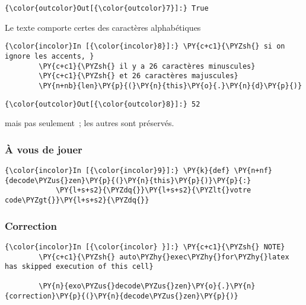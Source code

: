\begin{Verbatim}[commandchars=\\\{\},frame=single,framerule=0.3mm,rulecolor=\color{cellframecolor}]
{\color{outcolor}Out[{\color{outcolor}7}]:} True
\end{Verbatim}
            
    Le texte comporte certes des caractères alphabétiques

    \begin{Verbatim}[commandchars=\\\{\},frame=single,framerule=0.3mm,rulecolor=\color{cellframecolor}]
{\color{incolor}In [{\color{incolor}8}]:} \PY{c+c1}{\PYZsh{} si on ignore les accents, }
        \PY{c+c1}{\PYZsh{} il y a 26 caractères minuscules}
        \PY{c+c1}{\PYZsh{} et 26 caractères majuscules}
        \PY{n+nb}{len}\PY{p}{(}\PY{n}{this}\PY{o}{.}\PY{n}{d}\PY{p}{)}
\end{Verbatim}


\begin{Verbatim}[commandchars=\\\{\},frame=single,framerule=0.3mm,rulecolor=\color{cellframecolor}]
{\color{outcolor}Out[{\color{outcolor}8}]:} 52
\end{Verbatim}
            
    mais pas seulement~; les autres sont préservés.

    \hypertarget{uxe0-vous-de-jouer}{%
\subsubsection{À vous de jouer}\label{uxe0-vous-de-jouer}}

    \begin{Verbatim}[commandchars=\\\{\},frame=single,framerule=0.3mm,rulecolor=\color{cellframecolor}]
{\color{incolor}In [{\color{incolor}9}]:} \PY{k}{def} \PY{n+nf}{decode\PYZus{}zen}\PY{p}{(}\PY{n}{this}\PY{p}{)}\PY{p}{:}
            \PY{l+s+s2}{\PYZdq{}}\PY{l+s+s2}{\PYZlt{}votre code\PYZgt{}}\PY{l+s+s2}{\PYZdq{}}
\end{Verbatim}


    \hypertarget{correction}{%
\subsubsection{Correction}\label{correction}}

    \begin{Verbatim}[commandchars=\\\{\},frame=single,framerule=0.3mm,rulecolor=\color{cellframecolor}]
{\color{incolor}In [{\color{incolor} }]:} \PY{c+c1}{\PYZsh{} NOTE}
        \PY{c+c1}{\PYZsh{} auto\PYZhy{}exec\PYZhy{}for\PYZhy{}latex has skipped execution of this cell}
        
        \PY{n}{exo\PYZus{}decode\PYZus{}zen}\PY{o}{.}\PY{n}{correction}\PY{p}{(}\PY{n}{decode\PYZus{}zen}\PY{p}{)}
\end{Verbatim}



    
    
    
